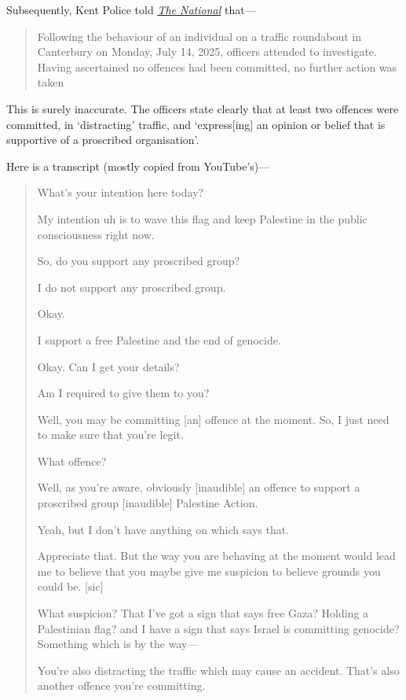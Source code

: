 Subsequently, Kent Police told \href{https://www.thenational.scot/news/25321245.disturbed-mp-hits-armed-police-threaten-gaza-protester/}{\emph{The National}} that---
\begin{quote}
    Following the behaviour of an individual on a traffic roundabout in Canterbury on Monday, July 14, 2025, officers attended to investigate. Having ascertained no offences had been committed, no further action was taken
\end{quote}

This is surely inaccurate. The officers state clearly that at least two offences were committed, in ‘distracting’ traffic, and ‘express[ing] an opinion or belief that is supportive of a proscribed organisation’.

Here is a transcript (mostly copied from YouTube’s)—
\begin{quote}
    What's your intention here today?
    
    My intention uh is to wave this flag and keep Palestine in the public consciousness right now.
    
    So, do you support any proscribed group?
    
    I do not support any proscribed group.
    
    Okay.
    
    I support a free Palestine and the end of genocide.
    
    Okay. Can I get your details?
    
    Am I required to give them to you?
    
    Well, you may be committing [an] offence at the moment. So, I just need to make sure that you're legit.
    
    What offence?
    
    Well, as you're aware, obviously [inaudible] an offence to support a proscribed group [inaudible] Palestine Action.
    
    Yeah, but I don't have anything on which says that.
    
    Appreciate that. But the way you are behaving at the moment would lead me to believe that you maybe give me suspicion to believe grounds you could be. [sic]
    
    What suspicion? That I've got a sign that says free Gaza? Holding a Palestinian flag? and I have a sign that says Israel is committing genocide? Something which is by the way—
    
    You’re also distracting the traffic which may cause an accident. That's also another offence you're committing.
    

\end{quote}
